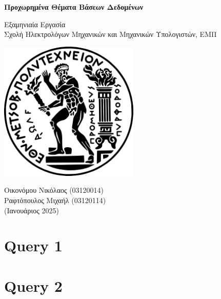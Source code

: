 \documentclass[a4paper,12pt]{article}
\begin{document}
\begin{otherlanguage}{greek}

\begin{titlepage}
    	\centering
    	\vspace*{2cm}

    	\Huge
    	\textbf{Προχωρημένα Θέματα Βάσεων Δεδομένων}

    	\vspace{0.5cm}
    	\LARGE
    	Εξαμηνιαία Εργασία \\
    	Σχολή Ηλεκτρολόγων Μηχανικών και Μηχανικών Υπολογιστών, ΕΜΠ

    	\vspace{1.5cm}
    	\includegraphics[width=0.5\textwidth]{ntua.png}

    	\vfill

   	\Large
	Οικονόμου Νικόλαος (03120014) \\
	Ραφτόπουλος Μιχαήλ (03120114) \\
    	(Ιανουάριος 2025)

    	\vspace{0.8cm}
\end{titlepage}

\newpage

\tableofcontents
\newpage


\section*{Query 1}
	\lipsum[1]

\section*{Query 2}
	\lipsum[2] %


\end{otherlanguage}
\end{document}

